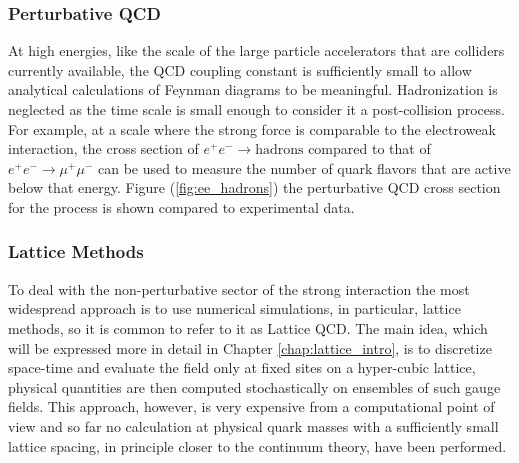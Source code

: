 \subsubsection{Perturbative QCD}
At high energies, like the scale of the large particle accelerators that are colliders currently available, the QCD coupling constant is sufficiently small to allow analytical calculations of Feynman diagrams to be meaningful. Hadronization is neglected as the time scale is small enough to consider it a post-collision process. 
For example, at a scale where the strong force is comparable to the electroweak interaction, the cross section of $e^+e^-\rightarrow \text{hadrons}$ compared to that of $e^+e^-\rightarrow \mu^+\mu^-$ can be used to measure the number of quark flavors that are active below that energy. Figure (\ref{fig:ee_hadrons}) the perturbative QCD cross section for the process is shown compared to experimental data.

\subsubsection{Lattice Methods}
To deal with the non-perturbative sector of the strong interaction the most widespread approach is to use numerical simulations, in particular, lattice methods, so it is common to refer to it as Lattice QCD. The main idea, which will be expressed more in detail in Chapter \ref{chap:lattice_intro}, is to discretize space-time and evaluate the field only at fixed sites on a hyper-cubic lattice, physical quantities are then computed stochastically on ensembles of such gauge fields. This approach, however, is very expensive from a computational point of view and so far no calculation at physical quark masses with a sufficiently small lattice spacing, in principle closer to the continuum theory, have been performed.

